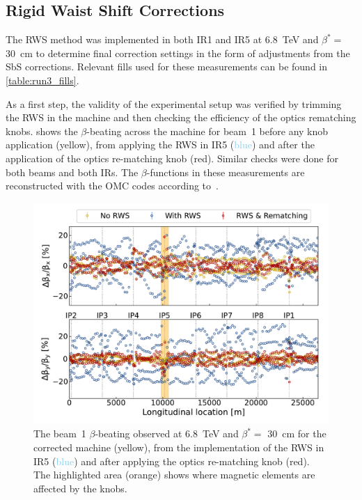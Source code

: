 \subsection{Rigid Waist Shift Corrections}
\label{subsection:rws_pos_measurements_corrections}

The RWS method was implemented in both IR\num{1} and IR\num{5} at \qty{6.8}{\tera\electronvolt} and \(\beta^{*}=\) \qty{30}{\centi\meter} to determine final correction settings in the form of adjustments from the SbS corrections.
Relevant fills used for these measurements can be found in \cref{table:run3_fills}.

As a first step, the validity of the experimental setup was verified by trimming the RWS in the machine and then checking the efficiency of the optics rematching knobs.
 shows the \(\beta\)-beating across the machine for beam~\num{1} before any knob application (\textcolor{butter}{yellow}), from applying the RWS in IR\num{5} (\textcolor{skyblue}{blue}) and after the application of the optics re-matching knob (\textcolor{scarletred}{red}).
Similar checks were done for both beams and both IRs.
The \(\beta\)-functions in these measurements are reconstructed with the OMC codes according to~\cite{PRAB:Wegscheider:Analytical_N_BPM}.

\begin{figure}[!htb]
    \centering
    \includegraphics*[width=\textwidth]{Figures/IR_Coupling_Correction/rematching_knob_efficiency.pdf}
    \caption{The beam~\num{1} \(\beta\)-beating observed at \qty{6.8}{\tera\electronvolt} and \(\beta^{*}=\) \qty{30}{\centi\meter} for the corrected machine (\textcolor{butter}{yellow}), from the implementation of the RWS in IR\num{5} (\textcolor{skyblue}{blue}) and after applying the optics re-matching knob (\textcolor{scarletred}{red}). The highlighted area (\textcolor{highlightorange}{orange}) shows where magnetic elements are affected by the knobs.}
    \label{figure:ir5_rws_rematching}
\end{figure}

